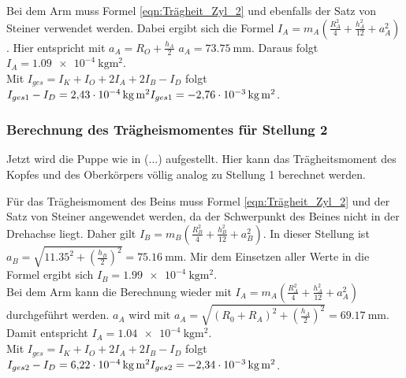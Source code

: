     Bei dem Arm muss Formel \ref{eqn:Trägheit_Zyl_2} und ebenfalls der Satz von Steiner verwendet werden.
    Dabei ergibt sich die Formel $I_A=m_A(\frac{R_A^2}{4}+\frac{h_A^2}{12}+a_A^2)$.
    Hier entspricht mit $a_A=R_O+\frac{h_A}{2}$ \; $a_A=\qty{73.75}{\milli\meter}$.
    Daraus folgt $I_A=\qty{1.09e-4}{\kilo\gram\meter\squared}$.\\
    
    Mit $I_{ges}=I_K+I_O+2I_A+2I_B-I_D$ folgt $I_{ges1}-I_D=\qty{2.43e-4}{\kilo\gram\meter\squared} \\
     I_{ges1}=\qty{-2.76e-3}{\kilo\gram\meter\squared}$.

    \subsubsection{Berechnung des Trägheismomentes für Stellung 2}
    Jetzt wird die Puppe wie in (...) aufgestellt.%
    Hier kann das Trägheitsmoment des Kopfes und des Oberkörpers völlig analog zu Stellung 1 berechnet werden.
    
    Für das Trägheismoment des Beins muss Formel \ref{eqn:Trägheit_Zyl_2} und der Satz von Steiner angewendet werden, da der  Schwerpunkt des Beines nicht in der Drehachse liegt.
    Daher gilt $I_B=m_B(\frac{R_B^2}{4}+\frac{h_B^2}{12}+a_B^2)$.
    In dieser Stellung ist $a_B=\sqrt{11.35^2+(\frac{h_B}{2})^2}=\qty{75.16}{\milli\meter}$.
    Mir dem Einsetzen aller Werte in die Formel ergibt sich $I_B=\qty{1.99e-4}{\kilo\gram\meter\squared}$.\\

    Bei dem Arm kann die Berechnung wieder mit $I_A=m_A(\frac{R_A^2}{4}+\frac{h_A^2}{12}+a_A^2)$ durchgeführt werden.
    $a_A$ wird mit $a_A=\sqrt{(R_0+R_A)^2+(\frac{h_A}{2})^2}=\qty{69.17}{\milli\meter}$.
    Damit entspricht $I_A=\qty{1.04e-4}{\kilo\gram\meter\squared}$.\\
    
    Mit $I_{ges}=I_K+I_O+2I_A+2I_B-I_D$ folgt $I_{ges2}-I_D=\qty{6.22e-4}{\kilo\gram\meter\squared} \\
     I_{ges2}=\qty{-2.34e-3}{\kilo\gram\meter\squared}$.





    
    

    

    
